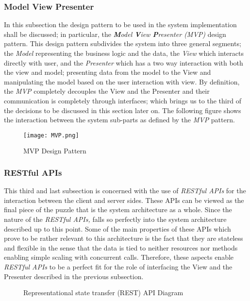 \subsubsection{Model View Presenter}
In this subsection the design pattern to be used in the system implementation shall be discussed; in particular, the \emph{\textbf{M}odel \textbf{V}iew \textbf{P}resenter (MVP)} design pattern. This design pattern subdivides the system into three general segments; the \emph{Model} representing the business logic and the data, the \emph{View} which interacts directly with user, and the \emph{Presenter} which has a two way interaction with both the view and model; presenting data from the model to the View and manipulating the model based on the user interaction with view. By definition, the \emph{MVP} completely decouples the View and the Presenter and their communication is completely through interfaces; which brings us to the third of the decisions to be discussed in this section later on. The following figure shows the interaction between the system sub-parts as defined by the \emph{MVP} pattern.

\begin{figure}[H]
\caption{MVP Design Pattern}
\label{fig:MVP-desgn-patt}
\centering
\texttt{[image: MVP.png]}
\end{figure}

\subsubsection{RESTful APIs}
This third and last subsection is concerned with the use of \emph{RESTful APIs} for the interaction between the client and server sides. These APIs can be viewed as the final piece of the puzzle that is the system architecture as a whole. Since the nature of the \emph{RESTful APIs,} falls so perfectly into the system architecture described up to this point. Some of the main properties of these APIs which prove to be rather relevant to this architecture is the fact that they are stateless and flexible in the sense that the data is tied to neither resources nor methods enabling simple scaling with concurrent calls. Therefore, these aspects enable \emph{RESTful APIs} to be a perfect fit for the role of interfacing the View and the Presenter described in the previous subsection.


\begin{figure}[H]
\caption{Representational state transfer (REST) API Diagram}
\label{fig:REST-APIp}
\centering

\end{figure}
